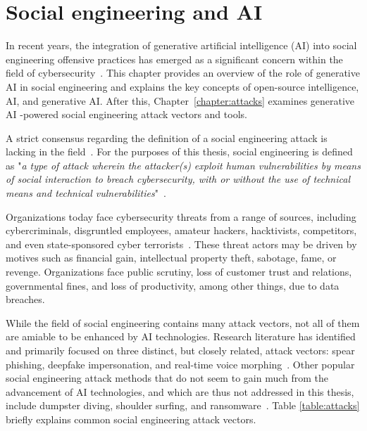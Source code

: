 

\chapter{Social engineering and AI\label{chapter:background}}
\begin{comment}
\end{comment}


%
%
In recent years, the integration of generative artificial intelligence (AI) into social engineering offensive practices has emerged as a significant concern within the field of cybersecurity~\citep{blauth_AI_Crime_Overview_Malicious_Use_Abuse_2022, king_AI_Crime_Interdisciplinary_Analysis_2019, mirsky_Threat_Offensive_AI_Organizations_2023}. This chapter provides an overview of the role of generative AI in social engineering and explains the key concepts of open-source intelligence, AI, and generative AI. After this, Chapter~\ref{chapter:attacks} examines generative AI -powered social engineering attack vectors and tools.



%
%
A strict consensus regarding the definition of a social engineering attack is lacking in the field~\citep{hatfield_SE_Evolution_Concept_2018}. For the purposes of this thesis, social engineering is defined as "\textit{a type of attack wherein the attacker(s) exploit human vulnerabilities by means of social interaction to breach cybersecurity, with or without the use of technical means and technical vulnerabilities}"~\citep{wang_Defining_Social_Engineering_2020}.



%
%
Organizations today face cybersecurity threats from a range of sources, including cybercriminals, disgruntled employees, amateur hackers, hacktivists, competitors, and even state-sponsored cyber terrorists~\citep{mirsky_Threat_Offensive_AI_Organizations_2023}. These threat actors may be driven by motives such as financial gain, intellectual property theft, sabotage, fame, or revenge. Organizations face public scrutiny, loss of customer trust and relations, governmental fines, and loss of productivity, among other things, due to data breaches.


%
%
While the field of social engineering contains many attack vectors, not all of them are amiable to be enhanced by AI technologies. Research literature has identified and primarily focused on three distinct, but closely related, attack vectors: spear phishing, deepfake impersonation, and real-time voice morphing~\citep{king_AI_Crime_Interdisciplinary_Analysis_2019}. Other popular social engineering attack methods that do not seem to gain much from the advancement of AI technologies, and which are thus not addressed in this thesis, include dumpster diving, shoulder surfing, and ransomware~\citep{mirsky_Threat_Offensive_AI_Organizations_2023}. Table \ref{table:attacks} briefly explains common social engineering attack vectors.

